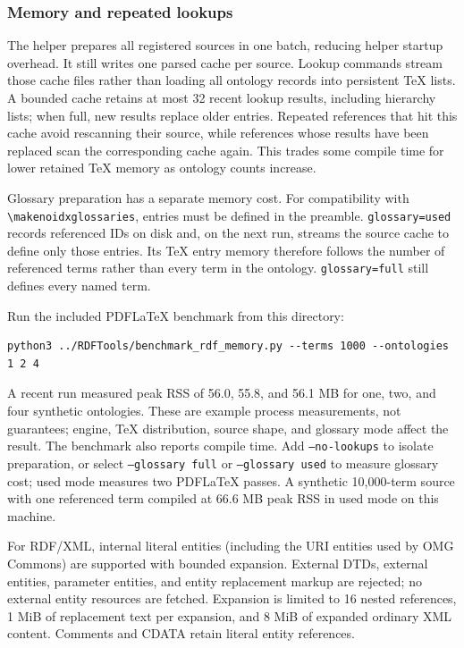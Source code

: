 \documentclass[10pt,letterpaper]{article}
\newcommand{\key}[1]{\texttt{#1}}
\begin{document}
\subsubsection{Memory and repeated lookups}

The helper prepares all registered sources in one batch, reducing helper
startup overhead. It still writes one parsed cache per source. Lookup commands
stream those cache files rather than loading all ontology records into
persistent TeX lists. A bounded cache retains at most 32 recent lookup results,
including hierarchy lists; when full, new results replace older entries.
Repeated references that hit this cache avoid rescanning their source, while
references whose results have been replaced scan the corresponding cache
again. This trades some compile time for lower retained TeX memory as ontology
counts increase.

Glossary preparation has a separate memory cost. For compatibility with
\verb|\makenoidxglossaries|, entries must be defined in the preamble.
\key{glossary=used} records referenced IDs on disk and, on the next run,
streams the source cache to define only those entries. Its TeX entry memory
therefore follows the number of referenced terms rather than every term in
the ontology. \key{glossary=full} still defines every named term.

Run the included PDFLaTeX benchmark from this directory:
\begin{lstlisting}
python3 ../RDFTools/benchmark_rdf_memory.py --terms 1000 --ontologies 1 2 4
\end{lstlisting}
A recent run measured peak RSS of 56.0, 55.8, and 56.1 MB for one, two, and
four synthetic ontologies. These are example process measurements, not
guarantees; engine, TeX distribution, source shape, and glossary mode affect
the result. The benchmark also reports compile time. Add \texttt{--no-lookups}
to isolate preparation, or select \texttt{--glossary full} or
\texttt{--glossary used} to measure glossary cost; used mode measures two
PDFLaTeX passes. A synthetic 10{,}000-term source with one referenced term
compiled at 66.6 MB peak RSS in used mode on this machine.

For RDF/XML, internal literal entities (including the URI entities used by
OMG Commons) are supported with bounded expansion. External DTDs, external
entities, parameter entities, and entity replacement markup are rejected;
no external entity resources are fetched. Expansion is limited to 16 nested
references, 1 MiB of replacement text per expansion, and 8 MiB of expanded
ordinary XML content. Comments and CDATA retain literal entity references.
\end{document}
